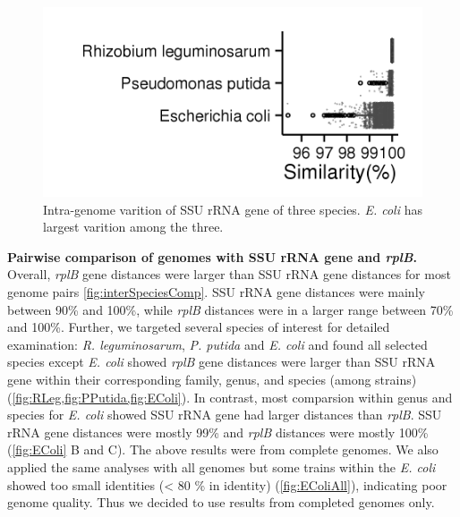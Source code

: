 \documentclass[]{msu-thesis}
\begin{document}
\begin{figure}[tbph!]
  \centering
  \includegraphics[scale=1]{figs/intra_genome_3species}

  \caption[Intra-genome varition of SSU rRNA gene]{Intra-genome varition of SSU rRNA gene of three species. \textit{E. coli} has largest varition among the three.}

  \label{fig:intraGenome3species}
\end{figure}

\textbf{Pairwise comparison of genomes with SSU rRNA gene and \textit{rplB}. }
Overall, \textit{rplB} gene distances were larger than SSU rRNA gene distances for most genome pairs \cref{fig:interSpeciesComp}. SSU rRNA gene distances were mainly between 90\% and 100\%, while \textit{rplB} distances were in a larger range between 70\% and 100\%. Further, we targeted several species of interest for detailed examination: \textit{R. leguminosarum}, \textit{P. putida} and \textit{E. coli} and found all selected species except \textit{E. coli} showed \textit{rplB} gene distances were larger than SSU rRNA gene within their corresponding family, genus, and species (among strains) (\cref{fig:RLeg,fig:PPutida,fig:EColi}). In contrast, most comparsion within genus and species for \textit{E. coli} showed SSU rRNA gene had larger distances than \textit{rplB}. SSU rRNA gene distances were mostly 99\% and \textit{rplB} distances were mostly 100\% (\cref{fig:EColi} B and C). The above results were from complete genomes. We also applied the same analyses with all genomes but some trains within the \textit{E. coli} showed too small identities (< 80 \% in identity) (\cref{fig:EColiAll}), indicating poor genome quality. Thus we decided to use results from completed genomes only. 
\end{document}

